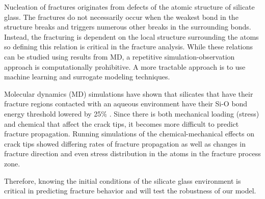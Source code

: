 Nucleation of fractures originates from defects of the atomic structure of silicate glass. 
The fractures do not necessarily occur when the weakest bond in the structure breaks and triggers numerous other breaks in the surrounding bonds. Instead, the fracturing is dependent on the local structure surrounding the atoms so defining this relation is critical in the fracture analysis. While these relations can be studied using results from MD, a repetitive simulation-observation approach is computationally prohibitive. A more tractable approach is to use machine learning and surrogate modeling techniques.

Molecular dynamics (MD) simulations have shown that silicates that have their fracture regions contacted with an aqueous environment have their Si-O bond energy threshold lowered by 25$\%$  \cite{chem_effects}. Since there is both mechanical loading (stress) and chemical that affect the crack tips, it becomes more difficult to predict fracture propagation. Running simulations of the chemical-mechanical effects on crack tips showed differing rates of fracture propagation as well as changes in fracture direction and even stress distribution in the atoms in the fracture process zone. 

Therefore, knowing the initial conditions of the silicate glass environment is critical in predicting fracture behavior and  will test the robustness of our model.




